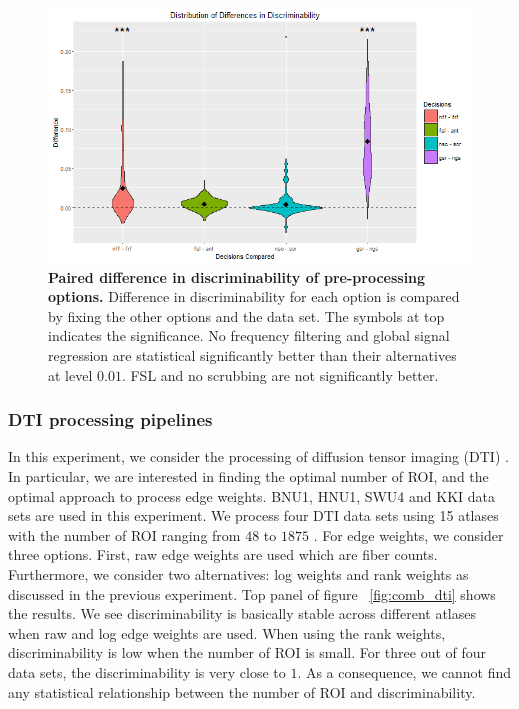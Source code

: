 \documentclass{article}
\begin{document}
\begin{figure}[ht!]
	\includegraphics[width=\linewidth]{../Figs/mri_decs_violin.png}
	\caption{{ \bf Paired difference in discriminability of pre-processing options.} Difference in discriminability for each option is compared by fixing the other options and the data set. The symbols at top indicates the significance. No frequency filtering and global signal regression are statistical significantly better than their alternatives at level $0.01$. FSL and no scrubbing are not significantly better. }
	\label{fig:decs}
\end{figure}






\subsubsection{DTI processing pipelines}
In this experiment, we consider the processing of diffusion tensor imaging (DTI) \cite{westin2002processing}. In particular, we are interested in finding the optimal number of ROI, and the optimal approach to process edge weights. BNU1, HNU1, SWU4 and KKI data sets are used in this experiment. We process four DTI data sets using 15 atlases with the number of ROI ranging from $48$ to $1875$ \cite{mori2005mri}. For edge weights, we consider three options. First, raw edge weights are used which are fiber counts. Furthermore, we consider two alternatives: log weights and rank weights as discussed in the previous experiment. Top panel of figure ~\ref{fig:comb_dti} shows the results. We see discriminability is basically stable across different atlases when raw and log edge weights are used. When using the rank weights, discriminability is low when the number of ROI is small. For three out of four data sets, the discriminability is very close to $1$. As a consequence, we cannot find any statistical relationship between the number of ROI and discriminability.
\end{document}
